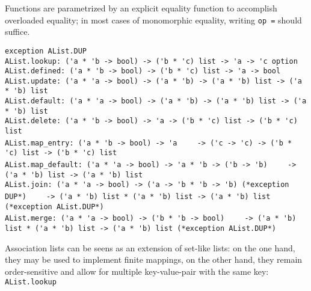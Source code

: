 \begin{isabellebody}
\begin{isamarkuptext}
  Functions are parametrized by an explicit equality function
  to accomplish overloaded equality;  in most cases of monomorphic
  equality, writing \verb|op =| should suffice.%
\end{isamarkuptext}%
\isamarkuptrue%
%
\isamarkuptrue%
%
\begin{isamarkuptext}%
\begin{mldecls}
  \verb|exception AList.DUP| \\
  \verb|AList.lookup: ('a * 'b -> bool) -> ('b * 'c) list -> 'a -> 'c option| \\
  \verb|AList.defined: ('a * 'b -> bool) -> ('b * 'c) list -> 'a -> bool| \\
  \verb|AList.update: ('a * 'a -> bool) -> ('a * 'b) -> ('a * 'b) list -> ('a * 'b) list| \\
  \verb|AList.default: ('a * 'a -> bool) -> ('a * 'b) -> ('a * 'b) list -> ('a * 'b) list| \\
  \verb|AList.delete: ('a * 'b -> bool) -> 'a -> ('b * 'c) list -> ('b * 'c) list| \\
  \verb|AList.map_entry: ('a * 'b -> bool) -> 'a|\isasep\isanewline%
\verb|    -> ('c -> 'c) -> ('b * 'c) list -> ('b * 'c) list| \\
  \verb|AList.map_default: ('a * 'a -> bool) -> 'a * 'b -> ('b -> 'b)|\isasep\isanewline%
\verb|    -> ('a * 'b) list -> ('a * 'b) list| \\
  \verb|AList.join: ('a * 'a -> bool) -> ('a -> 'b * 'b -> 'b) (*exception DUP*)|\isasep\isanewline%
\verb|    -> ('a * 'b) list * ('a * 'b) list -> ('a * 'b) list (*exception AList.DUP*)| \\
  \verb|AList.merge: ('a * 'a -> bool) -> ('b * 'b -> bool)|\isasep\isanewline%
\verb|    -> ('a * 'b) list * ('a * 'b) list -> ('a * 'b) list (*exception AList.DUP*)|
  \end{mldecls}%
\end{isamarkuptext}%
\isamarkuptrue%
%
\begin{isamarkuptext}%
Association lists can be seens as an extension of set-like lists:
  on the one hand, they may be used to implement finite mappings,
  on the other hand, they remain order-sensitive and allow for
  multiple key-value-pair with the same key: \verb|AList.lookup|

\end{isamarkuptext}
\end{isabellebody}
